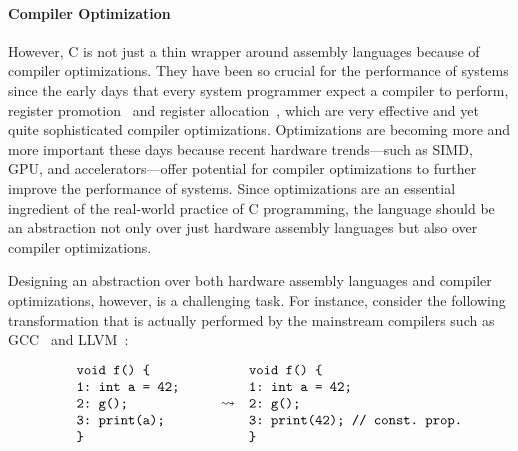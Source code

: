 \paragraph{Compiler Optimization}

However, C is not just a thin wrapper around assembly languages because of compiler optimizations.
They have been so crucial for the performance of systems since the early days that every system
programmer expect a compiler to perform, \eg{} register promotion~\cite{mem2reg} and register
allocation~\cite{regalloc}, which are very effective and yet quite sophisticated compiler
optimizations.  Optimizations are becoming more and more important these days because recent
hardware trends---such as SIMD, GPU, and accelerators---offer potential for compiler optimizations
to further improve the performance of systems.  Since optimizations are an essential ingredient of
the real-world practice of C programming, the language should be an abstraction not only over just
hardware assembly languages but also over compiler optimizations.



Designing an abstraction over both hardware assembly languages and compiler optimizations, however,
is a challenging task.  For instance, consider the following transformation that is actually
performed by the mainstream compilers such as GCC~\cite{gcc} and LLVM~\cite{llvm}:

\[\begin{array}{rcl}
\begin{minipage}{0.27\textwidth}
\begin{verbatim}
void f() {
1: int a = 42;
2: g();
3: print(a);
}
\end{verbatim}
\end{minipage}
&
\optarrow
&
\begin{minipage}{0.4\textwidth}
\begin{verbatim}
void f() {
1: int a = 42;
2: g();
3: print(42); // const. prop.
}
\end{verbatim}
\end{minipage}
\end{array}\]

